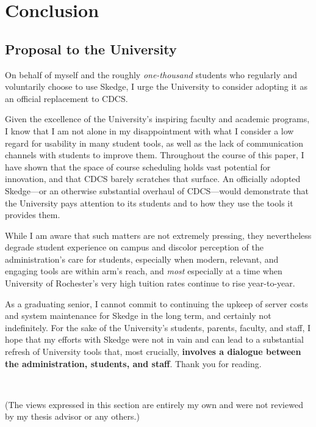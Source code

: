 
\chapter{Conclusion}

\vspace{-20pt}
\section{Proposal to the University}

On behalf of myself and the roughly \emph{one-thousand} students who regularly and voluntarily choose to use Skedge, I urge the University to consider adopting it as an official replacement to CDCS.

Given the excellence of the University's inspiring faculty and academic programs, I know that I am not alone in my disappointment with what I consider a low regard for usability in many student tools, as well as the lack of communication channels with students to improve them. Throughout the course of this paper, I have shown that the space of course scheduling holds vast potential for innovation, and that CDCS barely scratches that surface. An officially adopted Skedge---or an otherwise substantial overhaul of CDCS---would demonstrate that the University pays attention to its students and to how they use the tools it provides them.

While I am aware that such matters are not extremely pressing, they nevertheless degrade student experience on campus and discolor perception of the administration's care for students, especially when modern, relevant, and engaging tools are within arm's reach, and \emph{most} especially at a time when University of Rochester's very high tuition rates continue to rise year-to-year.

As a graduating senior, I cannot commit to continuing the upkeep of server costs and system maintenance for Skedge in the long term, and certainly not indefinitely. For the sake of the University's students, parents, faculty, and staff, I hope that my efforts with Skedge were not in vain and can lead to a substantial refresh of University tools that, most crucially, \textbf{involves a dialogue between the administration, students, and staff}. Thank you for reading.

\\
\vspace{10pt}

\noindent (The views expressed in this section are entirely my own and were not reviewed by my thesis advisor or any others.)


